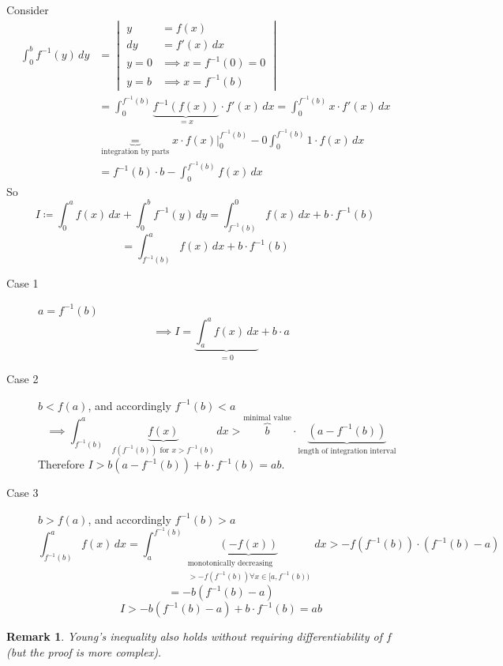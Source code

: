 \documentclass{article}
\newtheorem{remark}{Remark}  \numberwithin{remark}{section}
\begin{document}
Consider
\begin{align*}
  \int_0^b f^{-1}(y) \, dy
    &= \begin{vmatrix}
      y &= f(x) \\
      dy &= f'(x) \, dx \\
      y = 0 &\implies x = f^{-1}(0) = 0 \\
      y = b &\implies x = f^{-1}(b)
    \end{vmatrix} \\
    &= \int_0^{f^{-1}(b)} \underbrace{f^{-1}(f(x))}_{=x} \cdot f'(x) \, dx = \int_0^{f^{-1}(b)} x \cdot f'(x) \, dx \\
    &\underbrace{=}_{\text{integration by parts}} \left. x \cdot f(x) \right|_0^{f^{-1}(b)} - 0 \int_0^{f^{-1}(b)} 1 \cdot f(x) \, dx \\
    &= f^{-1}(b) \cdot b - \int_0^{f^{-1}(b)} f(x) \, dx
\end{align*}
So
\[
  I \coloneqq \int_0^a f(x) \, dx + \int_0^b f^{-1}(y) \, dy = \int_{f^{-1}(b)}^0 f(x) \, dx + b \cdot f^{-1}(b)
\] \[
  = \int_{f^{-1}(b)}^a f(x) \, dx + b \cdot f^{-1}(b)
\]

\begin{description}
  \item[Case 1] $a = f^{-1}(b)$
    \[ \implies I = \underbrace{\int_a^a f(x) \, dx}_{=0} + b \cdot a \]
  \item[Case 2] $b < f(a)$, and accordingly $f^{-1}(b) < a$
    \[ \implies \int_{f^{-1}(b)}^a \underbrace{f(x)}_{f(f^{-1}(b)) \text{ for } x > f^{-1}(b)} \, dx > \overbrace{b}^{\text{minimal value}} \cdot \underbrace{(a - f^{-1}(b))}_{\text{length of integration interval}}  \]
    Therefore $I > b(a - f^{-1}(b)) + b \cdot f^{-1}(b) = ab$.
  \item[Case 3] $b > f(a)$, and accordingly $f^{-1}(b) > a$
    \[ \int_{f^{-1}(b)}^a f(x) \, dx = \int_a^{f^{-1}(b)} \underbrace{(-f(x))}_{\substack{\text{monotonically decreasing} \\ > -f(f^{-1}(b)) \forall x \in [a,f^{-1}(b))}} \, dx > -f(f^{-1}(b)) \cdot (f^{-1}(b) - a) \]
    \[ = -b(f^{-1}(b) - a) \]
    \[ I > -b (f^{-1}(b) - a) + b \cdot f^{-1}(b) = ab \]
\end{description}

\begin{remark}
  Young's inequality also holds without requiring differentiability of $f$ (but the proof is more complex).
\end{remark}
\end{document}
